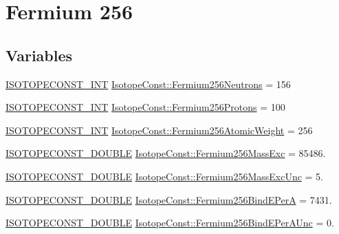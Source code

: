 \hypertarget{group___isotope_const-_fermium-_fm256}{}\section{Fermium 256}
\label{group___isotope_const-_fermium-_fm256}
\subsection*{Variables}
\begin{DoxyCompactItemize}
\item 
\mbox{\hyperlink{group___isotope_const-_macros_ga5f18360b3e99483a35c32d789e62621c}{I\+S\+O\+T\+O\+P\+E\+C\+O\+N\+S\+T\+\_\+\+I\+NT}} \mbox{\hyperlink{group___isotope_const-_fermium-_fm256_ga2a23e78b472ed39eaa4a37fa39e96b6b}{Isotope\+Const\+::\+Fermium256\+Neutrons}} = 156
\item 
\mbox{\hyperlink{group___isotope_const-_macros_ga5f18360b3e99483a35c32d789e62621c}{I\+S\+O\+T\+O\+P\+E\+C\+O\+N\+S\+T\+\_\+\+I\+NT}} \mbox{\hyperlink{group___isotope_const-_fermium-_fm256_ga5e5674d506414e7aa1471b749267ea2b}{Isotope\+Const\+::\+Fermium256\+Protons}} = 100
\item 
\mbox{\hyperlink{group___isotope_const-_macros_ga5f18360b3e99483a35c32d789e62621c}{I\+S\+O\+T\+O\+P\+E\+C\+O\+N\+S\+T\+\_\+\+I\+NT}} \mbox{\hyperlink{group___isotope_const-_fermium-_fm256_ga61910faf40c23b3f0e65b3cf00aecc47}{Isotope\+Const\+::\+Fermium256\+Atomic\+Weight}} = 256
\item 
\mbox{\hyperlink{group___isotope_const-_macros_ga8f45a7272ce02c0b4c65c44636ed719a}{I\+S\+O\+T\+O\+P\+E\+C\+O\+N\+S\+T\+\_\+\+D\+O\+U\+B\+LE}} \mbox{\hyperlink{group___isotope_const-_fermium-_fm256_ga684ff1d765904604890a0a0fe3210596}{Isotope\+Const\+::\+Fermium256\+Mass\+Exc}} = 85486.
\item 
\mbox{\hyperlink{group___isotope_const-_macros_ga8f45a7272ce02c0b4c65c44636ed719a}{I\+S\+O\+T\+O\+P\+E\+C\+O\+N\+S\+T\+\_\+\+D\+O\+U\+B\+LE}} \mbox{\hyperlink{group___isotope_const-_fermium-_fm256_gac9c708c8accca4d6a69032b187aa289b}{Isotope\+Const\+::\+Fermium256\+Mass\+Exc\+Unc}} = 5.
\item 
\mbox{\hyperlink{group___isotope_const-_macros_ga8f45a7272ce02c0b4c65c44636ed719a}{I\+S\+O\+T\+O\+P\+E\+C\+O\+N\+S\+T\+\_\+\+D\+O\+U\+B\+LE}} \mbox{\hyperlink{group___isotope_const-_fermium-_fm256_ga14585ac010283b4ffceccb2ce6a67dc3}{Isotope\+Const\+::\+Fermium256\+Bind\+E\+PerA}} = 7431.
\item 
\mbox{\hyperlink{group___isotope_const-_macros_ga8f45a7272ce02c0b4c65c44636ed719a}{I\+S\+O\+T\+O\+P\+E\+C\+O\+N\+S\+T\+\_\+\+D\+O\+U\+B\+LE}} \mbox{\hyperlink{group___isotope_const-_fermium-_fm256_ga13b6485c860f0ec4d3f31f64fb2eeded}{Isotope\+Const\+::\+Fermium256\+Bind\+E\+Per\+A\+Unc}} = 0.

\end{DoxyCompactItemize}
